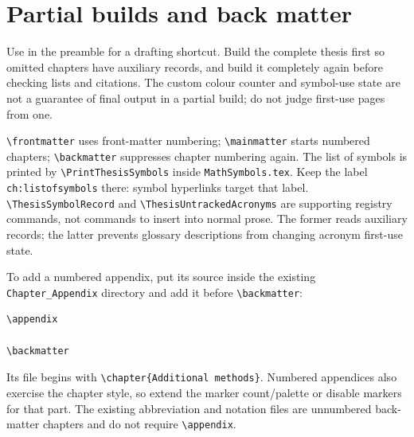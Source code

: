 \section{Partial builds and back matter}
Use \verb|| in the preamble for a
drafting shortcut. Build the complete thesis first so omitted chapters have
auxiliary records, and build it completely again before checking lists and
citations. The custom colour counter and symbol-use state are not a guarantee
of final output in a partial build; do not judge first-use pages from one.

\verb|\frontmatter| uses front-matter numbering;
\verb|\mainmatter| starts numbered chapters;
\verb|\backmatter| suppresses chapter numbering again. The list of symbols is
printed by \verb|\PrintThesisSymbols| inside \texttt{MathSymbols.tex}. Keep the
label \texttt{ch:listofsymbols} there: symbol hyperlinks target that label.
\verb|\ThesisSymbolRecord| and \verb|\ThesisUntrackedAcronyms| are supporting
registry commands, not commands to insert into normal prose. The former reads
auxiliary records; the latter prevents glossary descriptions from changing
acronym first-use state.

To add a numbered appendix, put its source inside the existing
\texttt{Chapter\_Appendix} directory and add it before \verb|\backmatter|:
\begin{lstlisting}
\appendix

\backmatter
\end{lstlisting}
Its file begins with \verb|\chapter{Additional methods}|. Numbered appendices
also exercise the chapter style, so extend the marker count/palette or disable
markers for that part. The existing abbreviation and notation files are
unnumbered back-matter chapters and do not require \verb|\appendix|.

